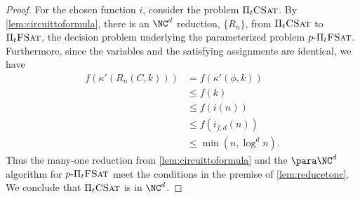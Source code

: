 \begin{proof}
  For the chosen function $i$, consider the problem $\Pi_t \textsc{CSat}$.
  By \autoref{lem:circuittoformula}, there is an $\NC^d$ reduction, $\{R_n\}$, from $\Pi_t \textsc{CSat}$ to $\Pi_t \textsc{FSat}$, the decision problem underlying the parameterized problem $p \textnormal{-} \Pi_t \textsc{FSat}$.
  Furthermore, since the variables and the satisfying assignments are identical, we have
  \begin{align*}
    f(\kappa'(R_n(C, k))) & = f(\kappa'(\phi, k)) \\
    & \leq f(k) \\
    & \leq f(i(n)) \\
    & \leq f(i_{f, d}(n)) \\
    & \leq \min(n, \log^d n).
  \end{align*}
  Thus the many-one reduction from \autoref{lem:circuittoformula} and the $\para \NC^d$ algorithm for $p \textnormal{-} \Pi_t \textsc{FSat}$ meet the conditions in the premise of \autoref{lem:reducetonc}.
  We conclude that $\Pi_t \textsc{CSat}$ is in $\NC^d$.
\end{proof}

